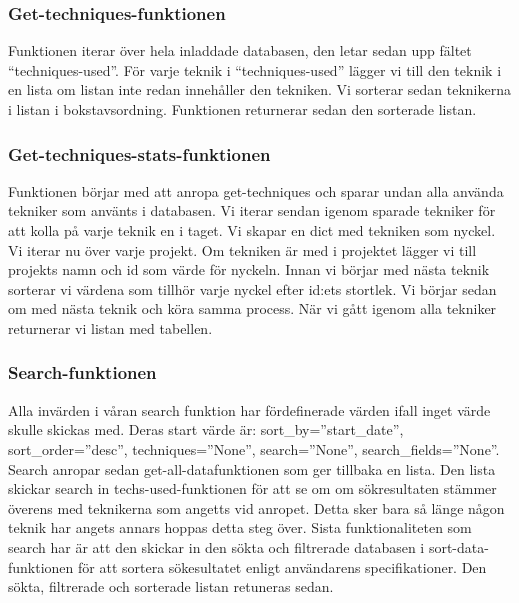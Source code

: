 \documentclass{TDP003mall}
\begin{document}
\subsubsection{Get-techniques-funktionen}
Funktionen iterar över hela inladdade databasen, den letar sedan upp fältet ``techniques-used''. För varje teknik i ``techniques-used'' lägger vi till den teknik i en lista om listan inte redan innehåller den tekniken. Vi sorterar sedan teknikerna i listan i bokstavsordning. Funktionen returnerar sedan den sorterade listan.

\subsubsection{Get-techniques-stats-funktionen}
Funktionen börjar med att anropa get-techniques och sparar undan alla använda tekniker som använts i databasen. Vi iterar sendan igenom sparade tekniker för att kolla på varje teknik en i taget. Vi skapar en dict med tekniken som nyckel. Vi iterar nu över varje projekt. Om tekniken är med i projektet lägger vi till projekts namn och id som värde för nyckeln. Innan vi börjar med nästa teknik sorterar vi värdena som tillhör varje nyckel efter id:ets stortlek. Vi börjar sedan om med nästa teknik och köra samma process. När vi gått igenom alla tekniker returnerar vi listan med tabellen.

\subsubsection{Search-funktionen}
Alla invärden i våran search funktion har fördefinerade värden ifall inget värde skulle skickas med. Deras start värde är: sort\_by=''start\_date'', sort\_order=''desc'', techniques=''None'', search=''None'', search\_fields=''None''. Search anropar sedan get-all-datafunktionen som ger tillbaka en lista. Den lista skickar search in techs-used-funktionen för att se om om sökresultaten stämmer överens med teknikerna som angetts vid anropet. Detta sker bara så länge någon teknik har angets annars hoppas detta steg över. Sista funktionaliteten som search har är att den skickar in den sökta och filtrerade databasen i sort-data-funktionen för att sortera sökesultatet enligt användarens specifikationer. Den sökta, filtrerade och sorterade listan retuneras sedan.
\end{document}
